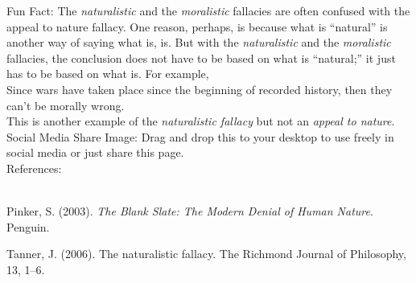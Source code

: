 \documentclass[a4paper,12pt,single,pdftex]{scrartcl}
\begin{document}
{      
        Fun Fact: The {\it naturalistic} and the {\it moralistic}  fallacies are often confused with the appeal to nature fallacy. One reason, perhaps, is because what is “natural” is another way of saying what is, is. But with the {\it naturalistic} and the {\it moralistic}  fallacies, the conclusion does not have to be based on what is “natural;” it just has to be based on what is. For example,
      \\

      
        Since wars have taken place since the beginning of recorded history, then they can’t be morally wrong.
      \\

      
        This is another example of the {\it naturalistic fallacy} but not an {\it appeal to nature}.
      \\

      
        Social Media Share Image: Drag and drop this to your desktop to use freely in social media or just share this page.
      \\

    
    References:

    
      
        
      \\

      
        
          Pinker, S. (2003). {\it The Blank Slate: The Modern Denial of Human Nature}. Penguin.
        
        
          Tanner, J. (2006). The naturalistic fallacy. The Richmond Journal of Philosophy, 13, 1–6.
        
      
    
  }
\end{document}
